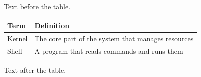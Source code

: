 \documentclass[11pt]{article}
\begin{document}
Text before the table.

\begin{tabular}{|l|p{3cm}|}\hline Term & Definition\\\hline Kernel & The core part of the system that manages resources\\\hline Shell & A program that reads commands and runs them\\\hline\end{tabular}

Text after the table.
\end{document}
